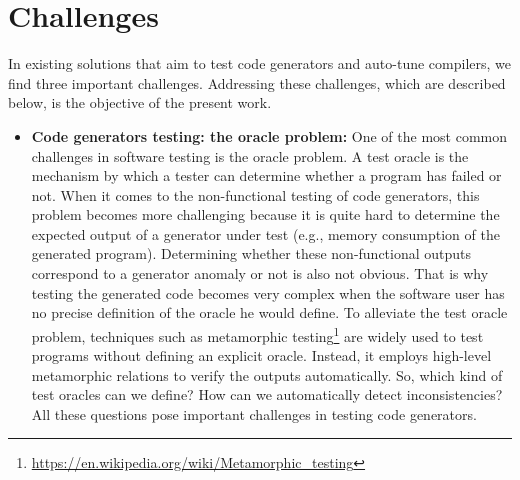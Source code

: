 \section{Challenges}
In existing solutions that aim to test code generators and auto-tune compilers, we find three important challenges. Addressing these challenges, which are described below, is the objective of the present work.
\begin{itemize}
\item
\textbf{Code generators testing: the oracle problem:} One of the most common challenges in software testing is the oracle problem. A test oracle is the mechanism by which a tester can determine whether a program has failed or not.
When it comes to the non-functional testing of code generators, this problem becomes more challenging because it is quite hard to determine the expected output of a generator under test (e.g., memory consumption of the generated program). Determining whether these non-functional outputs correspond to a generator anomaly or not is also not obvious. That is why testing the generated code becomes very complex when the software user has no precise definition of the oracle he would define. 
To alleviate the test oracle problem, techniques such as metamorphic testing\footnote{\url{https://en.wikipedia.org/wiki/Metamorphic_testing}} are widely used to test programs without defining an explicit oracle. Instead, it employs high-level metamorphic relations to verify the outputs automatically.
So, which kind of test oracles can we define? How can we automatically detect inconsistencies? All these questions pose important challenges in testing code generators.



\end{itemize}
